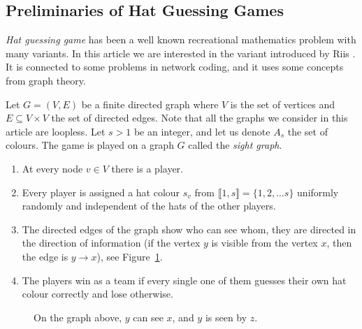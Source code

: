 \documentclass[11pt, a4paper]{kybernetika}
\begin{document}
	\subsection{Preliminaries of Hat Guessing Games}
	
	\emph{Hat guessing game} has been a well known recreational mathematics problem with many variants. In this article we are interested in the variant introduced by Riis \cite{riis2006utilising,riis2007information}. It is connected to some problems in network coding, and it uses some concepts from graph theory.
	
	Let $G=(V,E)$ be a finite directed graph where $V$ is the set of vertices and $E\subseteq V\times V$ the set of directed edges. Note that all the graphs we consider in this article are loopless. Let $s>1$ be an integer, and let us denote $A_s$ the set of colours. The game is played on a graph $G$ called the \emph{sight graph}.
	\begin{enumerate}
		\item At every node $v\in V$ there is a player.
		\item Every player is assigned a hat colour $s_v$ from $\llbracket1,s\rrbracket=\{1,2,\ldots s\}$ uniformly randomly and independent of the hats of the other players.
		\item The directed edges of the graph show who can see whom, they are directed in the direction of information (if the vertex $y$ is visible from the vertex $x$, then the edge is $y\rightarrow x$), see Figure~\ref{fig:dir-arrows}.
		\item The players win as a team if every single one of them guesses their own hat colour correctly and lose otherwise.
	\end{enumerate}
	\begin{figure}[h]
		\centering
		\caption{On the graph above, $y$ can see $x$, and $y$ is seen by $z$.}\label{fig:dir-arrows}
	\end{figure}
\end{document}

